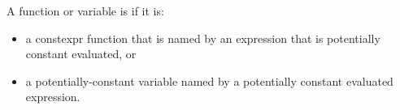 %
%
A function or variable is
if it is:
\begin{itemize}
\item
a constexpr function that is named by an expression
that is potentially constant evaluated, or

\item
a potentially-constant variable named by a potentially constant evaluated expression.
\end{itemize}

